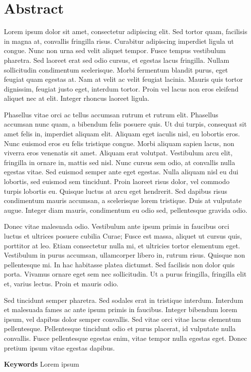 \chapter*{Abstract}

Lorem ipsum dolor sit amet, consectetur adipiscing elit. Sed tortor quam, facilisis in magna at, convallis fringilla risus. Curabitur adipiscing imperdiet ligula ut congue. Nunc non urna sed velit aliquet tempor. Fusce tempus vestibulum pharetra. Sed laoreet erat sed odio cursus, et egestas lacus fringilla. Nullam sollicitudin condimentum scelerisque. Morbi fermentum blandit purus, eget feugiat quam egestas at. Nam at velit ac velit feugiat lacinia. Mauris quis tortor dignissim, feugiat justo eget, interdum tortor. Proin vel lacus non eros eleifend aliquet nec at elit. Integer rhoncus laoreet ligula.

Phasellus vitae orci ac tellus accumsan rutrum et rutrum elit. Phasellus accumsan nunc quam, a bibendum felis posuere quis. Ut dui turpis, consequat sit amet felis in, imperdiet aliquam elit. Aliquam eget iaculis nisl, eu lobortis eros. Nunc euismod eros eu felis tristique congue. Morbi aliquam sapien lacus, non viverra eros venenatis sit amet. Aliquam erat volutpat. Vestibulum arcu elit, fringilla in ornare in, mattis sed nisl. Nunc cursus sem odio, at convallis nulla egestas vitae. Sed euismod semper ante eget egestas. Nulla aliquam nisl eu dui lobortis, sed euismod sem tincidunt. Proin laoreet risus dolor, vel commodo turpis lobortis eu. Quisque luctus at arcu eget hendrerit. Sed dapibus risus condimentum mauris accumsan, a scelerisque lorem tristique. Duis at vulputate augue. Integer diam mauris, condimentum eu odio sed, pellentesque gravida odio.

Donec vitae malesuada odio. Vestibulum ante ipsum primis in faucibus orci luctus et ultrices posuere cubilia Curae; Fusce est massa, aliquet ut cursus quis, porttitor at leo. Etiam consectetur nulla mi, et ultricies tortor elementum eget. Vestibulum in purus accumsan, ullamcorper libero in, rutrum risus. Quisque non pellentesque mi. In hac habitasse platea dictumst. Sed facilisis non dolor quis porta. Vivamus ornare eget sem nec sollicitudin. Ut a purus fringilla, fringilla elit et, varius lectus. Proin et mauris odio.

Sed tincidunt semper pharetra. Sed sodales erat in tristique interdum. Interdum et malesuada fames ac ante ipsum primis in faucibus. Integer bibendum lorem ipsum, vel dapibus dolor semper convallis. Sed vitae orci vitae lacus elementum pellentesque. Pellentesque tincidunt odio et purus placerat, id vulputate nulla convallis. Fusce pellentesque egestas enim, vitae tempor nulla egestas eget. Donec pretium ipsum vitae egestas dapibus.

\textbf{Keywords} Lorem ipsum
